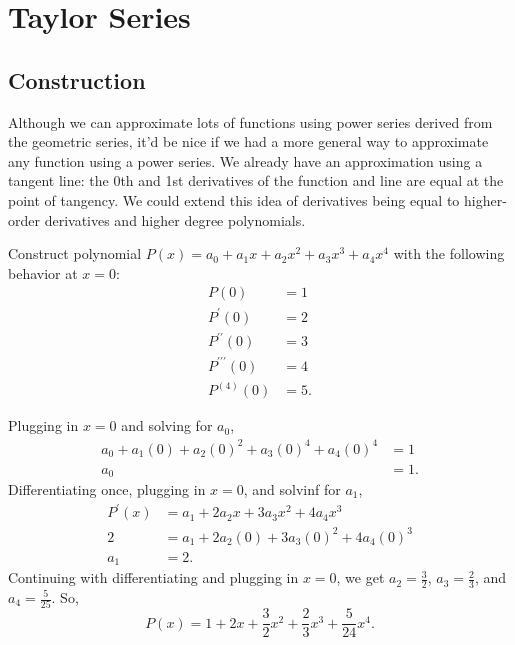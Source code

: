 \section{Taylor Series}
\subsection{Construction}
Although we can approximate lots of functions using power series derived from the geometric series, it'd be nice if we had a more general way to approximate any function using a power series.
We already have an approximation using a tangent line: the 0th and 1st derivatives of the function and line are equal at the point of tangency.
We could extend this idea of derivatives being equal to higher-order derivatives and higher degree polynomials.

\begin{example}
	Construct  polynomial $P(x)=a_0+a_1x + a_2x^2 + a_3x^3 + a_4x^4$ with the following behavior at $x=0$:
	\begin{align*}
		P(0) &= 1 \\
		P^\prime(0) &= 2 \\
		P^{\prime\prime}(0) &= 3 \\
		P^{\prime\prime\prime}(0) &= 4 \\
		P^{(4)}(0) &= 5.
	\end{align*}
\end{example}
Plugging in $x=0$ and solving for $a_0$,
\begin{align*}
	a_0 + a_1(0) + a_2(0)^2 + a_3(0)^4 + a_4(0)^4 &= 1 \\
	a_0 &= 1. 
\end{align*}
\indent
Differentiating once, plugging in $x=0$, and solvinf for $a_1$,
\begin{align*}
	P^\prime(x) &= a_1 + 2a_2x + 3a_3x^2 + 4a_4x^3 \\
	2 &= a_1 + 2a_2(0) + 3a_3(0)^2 + 4a_4(0)^3 \\
	a_1 &= 2.
\end{align*}
\indent
Continuing with differentiating and plugging in $x=0$, we get $a_2 = \frac{3}{2}$, $a_3 = \frac{2}{3}$, and $a_4 = \frac{5}{25}$.
So,
\begin{equation*}
	P(x) = 1 + 2x + \frac{3}{2}x^2 + \frac{2}{3}x^3 + \frac{5}{24}x^4.
\end{equation*}

